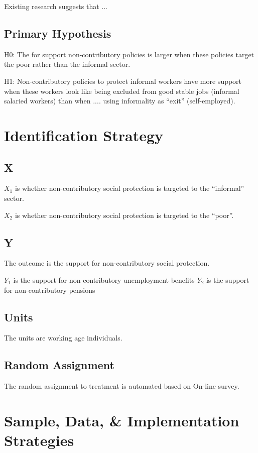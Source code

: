 \documentclass{report}\usepackage[]{graphicx}\usepackage[]{color}
\begin{document}
Existing research suggests that ...


\subsection*{Primary Hypothesis}

H0: The for support non-contributory policies is larger when these policies target the poor rather than the informal sector. 

H1: Non-contributory policies to protect informal workers have more support when these workers look like being excluded from good stable jobs (informal salaried workers) than when .... using informality as ``exit'' (self-employed).


\section{Identification Strategy}

\subsection*{X}

$X_1$ is whether non-contributory social protection is targeted to the ``informal'' sector. 

$X_2$ is whether non-contributory social protection is targeted to the ``poor''.

\subsection*{Y}

The outcome is the support for non-contributory social protection.

$Y_1$ is the support for non-contributory unemployment benefits
$Y_2$ is the support for non-contributory pensions


\subsection*{Units}

The units are working age individuals.  

\subsection*{Random Assignment}

The random assignment to treatment is automated based on On-line survey.


\section{Sample, Data, \& Implementation Strategies}
\end{document}
